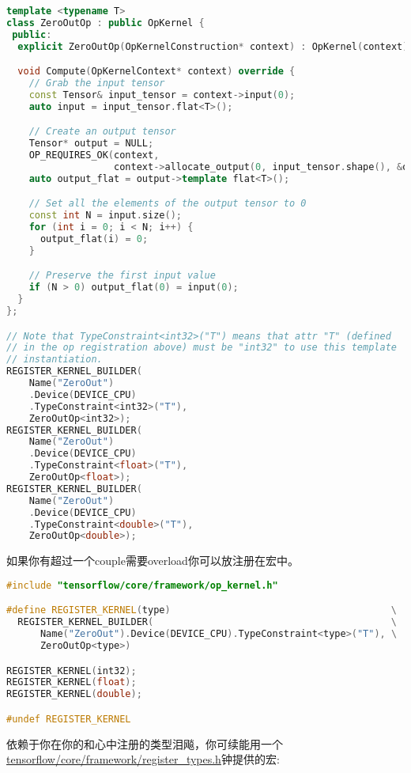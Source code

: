 \begin{lstlisting}[language=C++]
template <typename T>
class ZeroOutOp : public OpKernel {
 public:
  explicit ZeroOutOp(OpKernelConstruction* context) : OpKernel(context) {}

  void Compute(OpKernelContext* context) override {
    // Grab the input tensor
    const Tensor& input_tensor = context->input(0);
    auto input = input_tensor.flat<T>();

    // Create an output tensor
    Tensor* output = NULL;
    OP_REQUIRES_OK(context,
                   context->allocate_output(0, input_tensor.shape(), &output));
    auto output_flat = output->template flat<T>();

    // Set all the elements of the output tensor to 0
    const int N = input.size();
    for (int i = 0; i < N; i++) {
      output_flat(i) = 0;
    }

    // Preserve the first input value
    if (N > 0) output_flat(0) = input(0);
  }
};

// Note that TypeConstraint<int32>("T") means that attr "T" (defined
// in the op registration above) must be "int32" to use this template
// instantiation.
REGISTER_KERNEL_BUILDER(
    Name("ZeroOut")
    .Device(DEVICE_CPU)
    .TypeConstraint<int32>("T"),
    ZeroOutOp<int32>);
REGISTER_KERNEL_BUILDER(
    Name("ZeroOut")
    .Device(DEVICE_CPU)
    .TypeConstraint<float>("T"),
    ZeroOutOp<float>);
REGISTER_KERNEL_BUILDER(
    Name("ZeroOut")
    .Device(DEVICE_CPU)
    .TypeConstraint<double>("T"),
    ZeroOutOp<double>);

\end{lstlisting}
如果你有超过一个couple需要overload你可以放注册在宏中。
\begin{lstlisting}[language=C++]
#include "tensorflow/core/framework/op_kernel.h"

#define REGISTER_KERNEL(type)                                       \
  REGISTER_KERNEL_BUILDER(                                          \
      Name("ZeroOut").Device(DEVICE_CPU).TypeConstraint<type>("T"), \
      ZeroOutOp<type>)

REGISTER_KERNEL(int32);
REGISTER_KERNEL(float);
REGISTER_KERNEL(double);

#undef REGISTER_KERNEL
\end{lstlisting}
依赖于你在你的和心中注册的类型泪飚，你可续能用一个\href{https://www.github.com/tensorflow/tensorflow/blob/r1.4/tensorflow/core/framework/register_types.h}{tensorflow/core/framework/register\_types.h}钟提供的宏:
